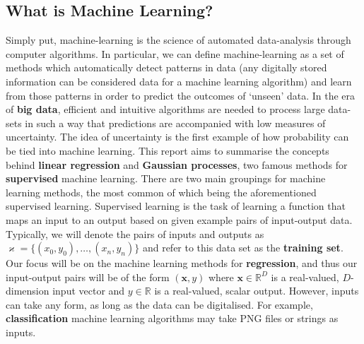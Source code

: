 \documentclass[10pt,a4paper]{article}
\numberwithin{equation}{section}
\theoremstyle{plain}
\theoremstyle{definition}
\theoremstyle{own}
\begin{document}
\subsection*{What is Machine Learning?}
Simply put, machine-learning is the science of automated data-analysis through computer algorithms. In particular, we can define machine-learning as a set of methods which automatically detect patterns in data (any digitally stored information can be considered data for a machine learning algorithm) and learn from those patterns in order to predict the outcomes of `unseen' data. In the era of \textbf{big data}, efficient and intuitive algorithms are needed to process large data-sets in such a way that predictions are accompanied with low measures of uncertainty. The idea of uncertainty is the first example of how probability can be tied into machine learning. This report aims to summarise the concepts behind \textbf{linear regression} and \textbf{Gaussian processes}, two famous methods for \textbf{supervised} machine learning. There are two main groupings for machine learning methods, the most common of which being the aforementioned supervised learning. Supervised learning is the task of learning a function that maps an input to an output based on given example pairs of input-output data. Typically, we will denote the pairs of inputs and outputs as $\varkappa = \{ (x_0,y_0), \ldots, (x_n, y_n) \}$ and refer to this data set as the \textbf{training set}. Our focus will be on the machine learning methods for \textbf{regression}, and thus our input-output pairs will be of the form $(\mathbf{x}, y)$ where $\mathbf{x} \in \mathbb{R}^D$ is a real-valued, $D$-dimension input vector and $y \in \mathbb{R}$ is a real-valued, scalar output. However, inputs can take any form, as long as the data can be digitalised. For example, \textbf{classification} machine learning algorithms may take PNG files or strings as inputs.
\end{document}
